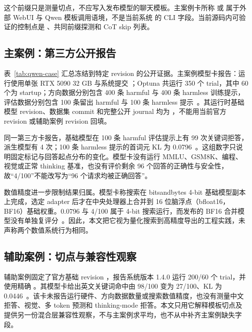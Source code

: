 这个前缀只是测量切点，不应写入发布模型的聊天模板。主案例卡所称  或  属于外部 WebUI 与 Qwen 模板调用语境，不是当前系统  的 CLI 字段。当前源码内可验证的控制点是 、共同前缀探测和 CoT skip 列表。

\subsection{主案例：第三方公开报告}

表~\ref{tab:qwen-case} 汇总冻结到特定 revision 的公开证据。主案例模型卡报告：运行使用单张 RTX 5090 32 GB 与系统提交 ；Optuna 共运行 350 个 trial，其中 60 个为 startup；方向数据分别包含 400 条 harmful 与 400 条 harmless 训练提示，评估数据分别包含 100 条留出 harmful 与 100 条 harmless 提示~\cite{qwen38maincase}。其运行时基础模型 revision、数据集 commit 和完整公开 journal 均为 ，不能用当前官方 revision 或辅助案例 revision 回填。



同一第三方卡报告，基础模型在 100 条 harmful 评估提示上有 99 次关键词拒答，派生模型有 4 次；100 条 harmless 提示的首词元 KL 为 0.0796~\cite{qwen38maincase}。这组数字只说明固定标记与回答起点分布的变化。模型卡没有运行 MMLU、GSM8K、编程、视觉或正常 thinking 基准，也没有评价剩余 96 个回答的正确性与安全性，故“4/100”不能改写为“96 个请求均被正确回答”。

数值精度进一步限制结果归属。模型卡称搜索在 bitsandbytes 4-bit 基础模型副本上完成，选定 adapter 后才在中央处理器上合并到 16 位脑浮点（bfloat16，BF16）基础权重。0.0796 与 4/100 属于 4-bit 搜索运行，而发布的 BF16 合并模型没有单独复评分~\cite{qwen38maincase}。因此，本文把它视为量化搜索到高精度导出的工程实践，未声称两个数值系统行为相同。

\subsection{辅助案例：切点与兼容性观察}

辅助案例固定了官方基础 revision ，报告系统版本 1.4.0 运行 200/60 个 trial，并使用精确 。其模型卡给出英文关键词命中由 98/100 变为 27/100、KL 为 0.0446~\cite{qwen38auxcase}。该卡未报告运行硬件、方向数据数量或搜索数值精度，也没有测量中文拒答、视觉、多 token 预测和 thinking-mode 拒答。本文只用它解释模板切点及提供另一份混合层兼容性观察，不与主案例求平均，也不从中补齐主案例缺失字段。
